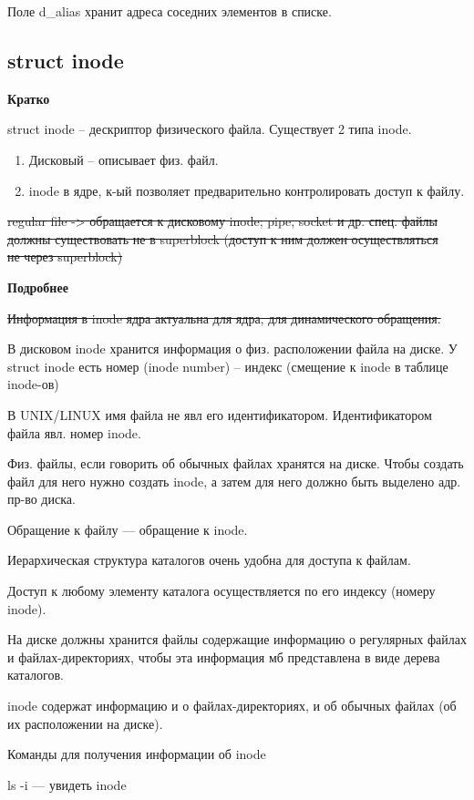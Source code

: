 Поле d\_alias хранит адреса соседних элементов в списке.

\subsection{struct inode}

\textbf{Кратко}

struct inode -- дескриптор физического файла. Существует 2 типа inode.
\begin{enumerate}
    \item Дисковый -- описывает физ. файл.
    \item inode в ядре, к-ый позволяет предварительно контролировать доступ к файлу.
\end{enumerate}

\sout{regular file -> обращается к дисковому inode; pipe, socket и др. спец. файлы должны существовать не в superblock (доступ к ним должен осуществляться \\ не через superblock)}

\textbf{Подробнее}

\sout{Информация в inode ядра актуальна для ядра, для динамического обращения.}

В дисковом inode хранится информация о физ. расположении файла на диске. У struct inode есть номер (inode number) -- индекс (смещение к inode в таблице inode-ов)

В UNIX/LINUX имя файла не явл его идентификатором. Идентификатором файла явл. номер inode.

Физ. файлы, если говорить об обычных файлах хранятся на диске. Чтобы создать файл для него нужно создать inode, а затем для него должно быть выделено адр. пр-во диска.

Обращение к файлу --- обращение к inode.

Иерархическая структура каталогов очень удобна для доступа к файлам.

Доступ к любому элементу каталога осуществляется по его индексу (номеру inode).

На диске должны хранится файлы содержащие информацию о регулярных файлах и файлах-директориях, чтобы  эта информация мб представлена в виде дерева каталогов.

inode содержат информацию и о файлах-директориях, и об обычных файлах (об их расположении на диске).

Команды для получения информации об inode

ls -i --- увидеть inode

